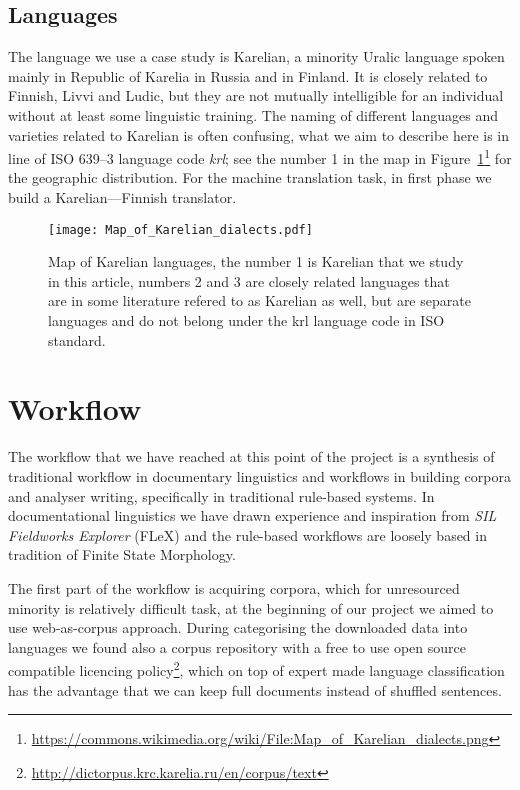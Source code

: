 \documentclass[11pt]{article}
\begin{document}
\subsection{Languages}

The language we use a case study is Karelian, a minority Uralic language spoken
mainly in Republic of Karelia in Russia and in Finland. It is closely related
to Finnish, Livvi and Ludic, but they are not mutually intelligible for an
individual without at least some linguistic training. The naming of different
languages and varieties related to Karelian is often confusing, what we aim to
describe here is in line of ISO 639--3 language code \textit{krl}; see the
number 1 in the map in
Figure~\ref{fig:krl-map}\footnote{\url{https://commons.wikimedia.org/wiki/File:Map_of_Karelian_dialects.png}}
for the geographic distribution. For the machine translation task, in first
phase we build a Karelian---Finnish translator.

\begin{figure}
    \texttt{[image: Map\_of\_Karelian\_dialects.pdf]}
    \caption{Map of Karelian languages, the number 1 is Karelian that
    we study in this article, numbers 2 and 3 are closely related languages
    that are in some literature refered to as Karelian as well, but are
    separate languages and do not belong under the krl language code in
    ISO standard.\label{fig:krl-map}}
\end{figure}

\section{Workflow}
\label{sec:workflow}

The workflow that we have reached at this point of the project is a synthesis
of traditional workflow in documentary linguistics and workflows in building
corpora and analyser writing, specifically in traditional rule-based systems.
In documentational linguistics we have drawn experience and inspiration from
\textit{SIL Fieldworks Explorer} (FLeX) and the rule-based workflows are
loosely based in tradition of Finite State Morphology.

The first part of the workflow is acquiring corpora, which for unresourced
minority is relatively difficult task, at the beginning of our project we aimed
to use web-as-corpus\cite{} approach. During categorising the downloaded data
into languages we found also a corpus repository with a free to use open source
compatible licencing
policy\footnote{\url{http://dictorpus.krc.karelia.ru/en/corpus/text}}, which on
top of expert made language classification has the advantage that we can keep
full documents instead of shuffled sentences.
\end{document}
